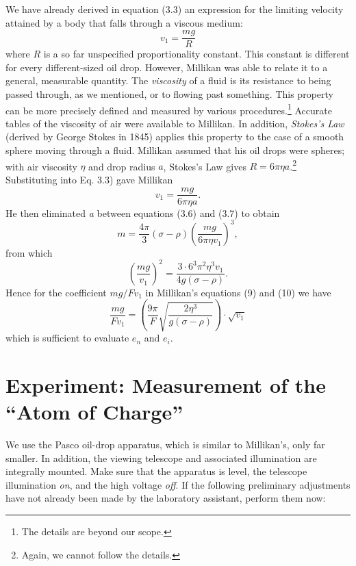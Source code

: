 We have already derived in equation (3.3) an expression for the limiting 
velocity attained by a body that falls through a viscous medium:
%
\begin{equation*}\tag{3.3}
v_1 = \frac{mg}{R}
\end{equation*}
%
where $R$ is a so far unspecified proportionality constant. This
constant is different for every different-sized oil drop. However,
Millikan was able to relate it to a general, measurable quantity. The
\emph{viscosity} of a fluid is its resistance to being passed through,
as we mentioned, or to flowing past something. This property can be more
precisely defined and measured by various procedures.\footnote{The
  details are beyond our scope.} Accurate tables of the viscosity of air
were available to Millikan. In addition, \emph{Stokes's Law} (derived by
George Stokes in 1845) applies this property to the case of a smooth
sphere moving through a fluid. Millikan assumed that his oil drops were
spheres; with air viscosity $\eta$ and drop radius $a$, Stokes's
Law gives $R = 6\pi \eta a$.\footnote{Again, we cannot follow the
  details.} Substituting into Eq. 3.3) gave Millikan
%
\begin{equation*}\tag{3.7}
v_1 = \frac{mg}{6\pi\eta a}.
\end{equation*}
%
He then eliminated \emph{a} between equations (3.6) and (3.7) to obtain
%
\begin{equation*}
m = \frac{4\pi}{3}(\sigma\!-\!\rho)\left(\frac{mg}{6\pi\eta v_1}\right)^3,
\end{equation*}
%
from which
%
\begin{equation*}
\left(\frac{mg}{v_1}\right)^2 = \frac{3\cdot6^3\pi^2\eta^3{v}_1}{4g(\sigma\!-\!\rho)}.
\end{equation*}
%
Hence for the coefficient $mg/Fv_1$ in Millikan's equations (9) and (10) we have
%
\begin{equation*}\tag{3.8}
\frac{mg}{Fv_1} = \left(\frac{9\pi}{F}\sqrt{\frac{2\eta^3}{g(\sigma\!-\!\rho)}}\right)\cdot\sqrt{v_1}
\end{equation*}
%
which is sufficient to evaluate $e_n$ and $e_i$.

\section*{Experiment: Measurement of the ``Atom of Charge''}

We use the Pasco oil-drop apparatus, which is similar to Millikan's,
only far smaller. In addition, the viewing telescope and associated
illumination are integrally mounted. Make sure that the apparatus is
level, the telescope illumination \emph{on}, and the high voltage
\emph{off}. If the following preliminary adjustments have not already
been made by the laboratory assistant, perform them now:

